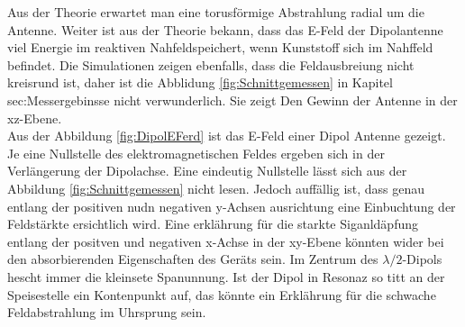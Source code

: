 Aus der Theorie erwartet man eine torusförmige Abstrahlung radial um die Antenne. Weiter ist aus der Theorie bekann, dass das E-Feld der Dipolantenne viel Energie im reaktiven Nahfeldspeichert, wenn Kunststoff sich im Nahffeld befindet. Die Simulationen zeigen ebenfalls, dass die Feldausbreiung nicht kreisrund ist, daher ist die Abblidung \ref{fig:Schnittgemessen} in Kapitel {sec:Messergebinsse} nicht verwunderlich. Sie zeigt Den Gewinn der Antenne in der xz-Ebene.\\
Aus der Abbildung \ref{fig:DipolEFerd} ist das E-Feld einer Dipol Antenne gezeigt. Je eine Nullstelle des elektromagnetischen Feldes ergeben sich in der Verlängerung der Dipolachse. Eine eindeutig Nullstelle lässt sich aus der Abbildung \ref{fig:Schnittgemessen} nicht lesen. Jedoch auffällig ist, dass genau entlang der positiven nudn negativen y-Achsen ausrichtung eine Einbuchtung der Feldstärkte ersichtlich wird. Eine erklährung für die starkte Siganldäpfung entlang der positven und negativen x-Achse in der xy-Ebene könnten wider bei den absorbierenden Eigenschaften des Geräts sein. Im Zentrum des $\lambda/2$-Dipols hescht immer die kleinsete Spanunnung. Ist der Dipol in Resonaz so titt an der Speisestelle ein Kontenpunkt auf, das könnte ein Erklährung für die schwache Feldabstrahlung im Uhrsprung sein.